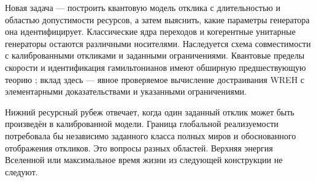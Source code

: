{Новая задача --- построить квантовую модель отклика с длительностью и областью допустимости ресурсов, а затем выяснить, какие параметры генератора она идентифицирует. Классические ядра переходов и когерентные унитарные генераторы остаются различными носителями. Наследуется схема совместимости с калиброванными откликами и заданными ограничениями. Квантовые пределы скорости и идентификация гамильтонианов имеют обширную предшествующую теорию \cite{AA,ZS}; вклад здесь --- явное проверяемое вычисление достраивания WREH с элементарными доказательствами и указанными ограничениями.}

{Нижний ресурсный рубеж отвечает, когда один заданный отклик может быть произведён в калиброванной модели. Граница глобальной реализуемости потребовала бы независимо заданного класса полных миров и обоснованного отображения откликов. Это вопросы разных областей. Верхняя энергия Вселенной или максимальное время жизни из следующей конструкции не следуют.}

